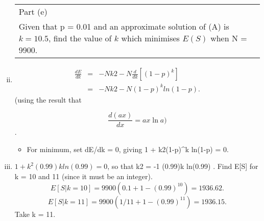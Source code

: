 \documentclass[a4paper,12pt]{article}
\begin{document}
\begin{enumerate}[(i)]
  \begin{table}[ht!]
     \centering
     \begin{tabular}{|p{15cm}|}
     \hline  
\noindent Part (e)\\ Given that p = 0.01 and an approximate solution of (A) is $k = 10.5$, find the value of $k$ which minimises $E(S)$ when N = 9900.
\\ \hline
      \end{tabular}
    \end{table}
\item 

\begin{eqnarray*} 
\frac{dE}{dk}
 &=& -N
k2 - N \frac{d}{dk} \left[ (1-p)^k \right] \\
&=& -N
k2 - N(1-p)^k ln(1-p).
\end{eqnarray*}
(using the result that

\[ \frac{d(ax)}{dx} = ax \ln a)\].
\begin{itemize}
\item For minimum, set dE/dk = 0, giving 1 + k2(1-p)^k ln(1-p) = 0.
\end{itemize}
\item $1 + k^2(0.99)k ln(0.99) = 0$, so that k2 = -1
(0.99)k ln(0.99) .
Find E[S] for k = 10 and 11 (since it must be an integer).
\[E[S|k = 10] = 9900(0.1 + 1 - (0.99)^{10}) = 1936.62.\]
\[E[S|k = 11] = 9900( 1/11 + 1 - (0.99)^{11}) = 1936.15.\]
Take k = 11.
\end{enumerate}
\end{document}
